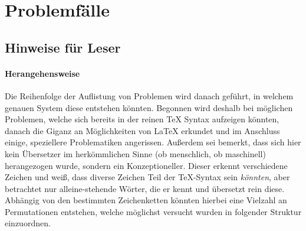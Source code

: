 


\section{Problemfälle}
\subsection{Hinweise für Leser}
\paragraph*{Herangehensweise}
Die Reihenfolge der Auflistung von Problemen wird danach geführt, in welchem genauen System diese entstehen könnten. Begonnen wird deshalb bei möglichen Problemen, welche sich bereits in der reinen \TeX{} Syntax aufzeigen könnten, danach die Giganz an Möglichkeiten von \LaTeX{} erkundet und im Anschluss einige, speziellere Problematiken angerissen.
Außerdem sei bemerkt, dass sich hier kein Übersetzer im herkömmlichen Sinne (ob menschlich, ob maschinell) herangezogen wurde, sondern ein Konzeptioneller. Dieser erkennt verschiedene Zeichen und weiß, dass diverse Zeichen Teil der \TeX{}-Syntax sein \textit{könnten}, aber betrachtet nur alleine-stehende Wörter, die er kennt und übersetzt rein diese. Abhängig von den bestimmten Zeichenketten könnten hierbei eine Vielzahl an Permutationen entstehen, welche möglichst versucht wurden in folgender Struktur einzuordnen.

